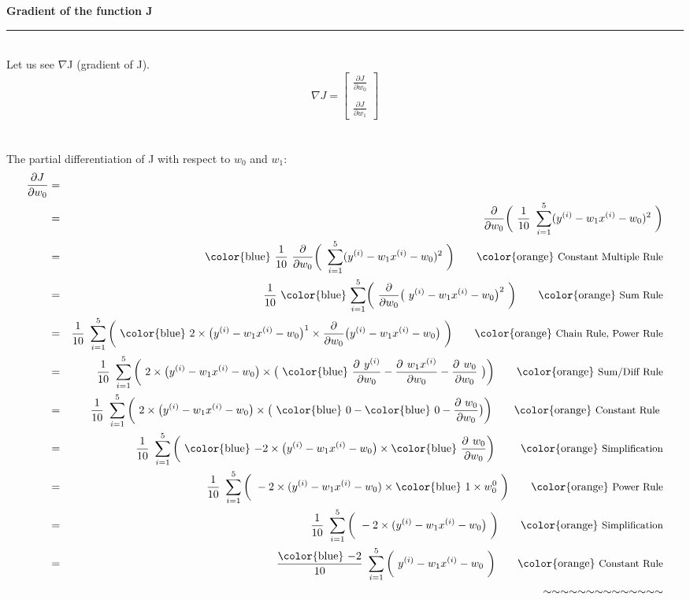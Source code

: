\documentclass[12pt]{article}
\newcommand{\afmod}[1]{\text{{\color{blue} \textbf{$#1$}}}}
\newcommand{\qtext}[1]{\qquad \text{{\color{orange} \small{#1}}}}
\begin{document}
\break
{\Large \textbf{Gradient of the function J}} \\
\rule{\textwidth}{1pt}
\vspace{3mm} \\
\noindent Let us see $\nabla$J (gradient of J).
\[
\nabla J =
\begin{bmatrix}
    \frac{\partial J}{\partial w_0} \\
\\
    \frac{\partial J}{\partial w_1} 
\end{bmatrix}
\] \\
\vspace{5mm} \\
\noindent The partial differentiation of J with respect to $w_0$ and $w_1$:\\
\begin{eqnarray*}
\frac{\partial J}{\partial w_0} & = &  \\
& = & \frac{\partial}{\partial w_0} \bigg(\ \frac{1}{10} \ \sum_{i=1}^{5} (y^{(i)} - w_1x^{(i)} - w_0)^2\ \bigg) \\
& = & \afmod{\frac{1}{10}} \ \frac{\partial}{\partial w_0} \bigg(\  \sum_{i=1}^{5} (y^{(i)} - w_1x^{(i)} - w_0)^2\ \bigg)
 \qtext{Constant Multiple Rule} \\
& = & \frac{1}{10} \ \afmod{\sum_{i=1}^{5}} \bigg(\ \frac{\partial}{\partial w_0} \big(\ y^{(i)} - w_1x^{(i)} - w_0\big)^2\ \bigg) \qtext{Sum Rule} \\
& = & \frac{1}{10} \ \sum_{i=1}^{5} \bigg(\ \afmod{2 \times \big(y^{(i)} - w_1x^{(i)} - w_0 \big)^1 \times \frac{\partial}{\partial w_0} \big(y^{(i)} - w_1x^{(i)} - w_0 \big)}\ \bigg) \qtext{Chain Rule, Power Rule} \\
& = & \frac{1}{10} \ \sum_{i=1}^{5} \bigg(\ 2 \times \big(y^{(i)}-w_1x^{(i)}-w_0 \big) \times \big(\ \afmod{\frac{\partial\ y^{(i)}}{\partial w_0} - \frac{\partial\ w_1x^{(i)}}{\partial w_0} - \frac{\partial\ w_0}{\partial w_0}} \ \big) \bigg) \qtext{Sum/Diff Rule} \\
& = & \frac{1}{10} \ \sum_{i=1}^{5} \bigg(\ 2 \times \big(y^{(i)} - w_1x^{(i)} - w_0 \big) \times \big(\ \afmod{0} - \afmod{0} - \frac{\partial \ w_0}{\partial w_0} \big) \bigg) \qtext{Constant Rule } \\
& = & \frac{1}{10} \ \sum_{i=1}^{5} \bigg(\ \afmod{-}2 \times \big( y^{(i)} - w_1x^{(i)} - w_0 \big) \times \afmod{\frac{\partial\ w_0}{\partial w_0}}\bigg)\ \qtext{Simplification} \\
& = & \frac{1}{10} \ \sum_{i=1}^{5} \bigg(\ -2 \times (y^{(i)} - w_1x^{(i)} - w_0) \times \afmod{1 \times w_0^0} \ \bigg) \qtext{Power Rule} \\
& = & \frac{1}{10} \ \sum_{i=1}^{5} \bigg(\ -2 \times (y^{(i)} - w_1x^{(i)} - w_0 \big) \ \bigg) \qtext{Simplification} \\
& = & \frac{\afmod{-2}}{10} \ \sum_{i=1}^{5} \bigg( \ y^{(i)} - w_1x^{(i)} - w_0 \ \bigg) \qtext{Constant Rule} \\
& & \quad  \sim \sim \sim \sim \sim \sim \sim \sim \sim \sim \sim \sim \sim \sim
\end{eqnarray*}
\end{document}
